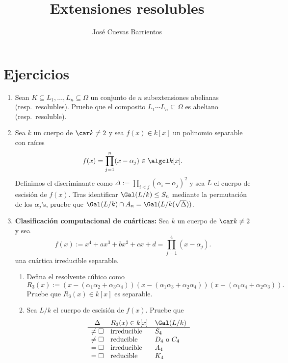 \documentclass[11pt, reqno]{amsart}
\title{Extensiones resolubles}
\date{\DTMdate{2025-09-03}}
\author{José Cuevas Barrientos}
\begin{document}
\maketitle

\section{Ejercicios}
\begin{enumerate}
	\item Sean $K \subseteq L_1, \dots, L_n \subseteq \Omega$ un conjunto de $n$ subextensiones abelianas (resp.\ resolubles).
		Pruebe que el composito $L_1 \cdots L_n \subseteq \Omega$ es abeliano (resp.\ resoluble).

	\item Sea $k$ un cuerpo de $\car k \ne 2$ y sea $f(x) \in k[x]$ un polinomio separable con raíces
		\[
			f(x) = \prod_{j=1}^{n} (x - \alpha_j) \in \algcl k[x].
		\]
		Definimos el discriminante como $\Delta := \prod_{i < j} (\alpha_i - \alpha_j)^2$ y sea $L$ el cuerpo de escisión de $f(x)$.
		Tras identificar $\Gal(L/k) \le S_n$ mediante la permutación de los $\alpha_j$'s, pruebe que $\Gal(L/k) \cap A_n = \Gal(L/k(\sqrt{\Delta}))$.

	\item\label{ex:quartic_comp} \textbf{Clasificación computacional de cuárticas:}
		Sea $k$ un cuerpo de $\car k \ne 2$ y sea
		\[
			f(x) := x^4 + ax^3 + bx^2 + cx + d = \prod_{j=1}^{4} (x - \alpha_j).
		\]
		una cuártica irreducible separable.
		\begin{enumerate}
			\item Defina el resolvente cúbico como
				\begin{equation*}
					R_3(x) := (x - (\alpha_1\alpha_2 + \alpha_3\alpha_4))(x - (\alpha_1\alpha_3 + \alpha_2\alpha_4))(x -
					(\alpha_1\alpha_4 + \alpha_2\alpha_3)).
				\end{equation*}
				Pruebe que $R_3(x) \in k[x]$ es separable.

			\item Sea $L/k$ el cuerpo de escisión de $f(x)$.
				Pruebe que
				\[
					\begin{array}{cll}
						\Delta & R_3(x) \in k[x] & \Gal(L/k) \\
						\hline
						\ne\square & \text{irreducible} & S_4 \\
						\ne\square &   \text{reducible} & D_4 \text{ o } C_4 \\
						= \square & \text{irreducible} & A_4 \\
						= \square &   \text{reducible} & K_4 \\
					\end{array}
				\]


\end{enumerate}
\end{enumerate}
\end{document}
